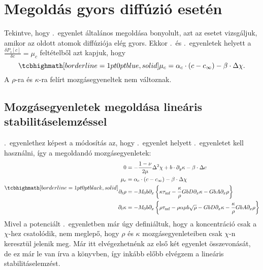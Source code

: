 \documentclass[10pt,a4paper]{scrartcl}
\begin{document}
\section{Megoldás gyors diffúzió esetén}
Tekintve, hogy .\ egyenlet általános megoldása bonyolult, azt az esetet vizsgáljuk, amikor az oldott atomok diffúziója elég gyors. Ekkor .\ és .\ egyenletek helyett a $\frac{{\delta {P_s}[c]}}{{\delta c}} = \mu_c$ feltételből azt kapjuk, hogy
\begin{equation} \label{eq:fd_c}
\tcbhighmath[borderline={1pt}{0pt}{blue,solid}]{
\mu_c = {\alpha _c} \cdot \left( {c - {c_\infty }} \right) - \beta  \cdot \Delta \chi.}
\end{equation}
A $\rho$-ra és $\kappa$-ra felírt mozgásegyeneltek nem változnak.
\subsection{Mozgásegyenletek megoldása lineáris stabilitáselemzéssel}
.\ egyenlethez képest a módosítás az, hogy .\ egyenlet helyett .\ egyenletet kell használni, így a megoldandó mozgásegyenletek:
\begin{gather}
\tcbhighmath[borderline={1pt}{0pt}{black,solid}]{
\begin{aligned}
0 & = - \frac{{1 - \nu }}{{2\mu }}{\Delta ^2}\chi  + b\cdot\partial_y\kappa - \beta  \cdot \Delta c \\
  \mu_c & = {\alpha _c} \cdot \left( {c - {c_\infty }} \right) - \beta  \cdot \Delta \chi \\ 
    {\partial _t}\rho  &  =  - {M_0}b{\partial _x}\left\{ {\kappa {\tau _{{\text{mf}}}} - \frac{\kappa }{\rho }GbD{\partial _x}\kappa  - GbA{\partial _x}\rho } \right\} \\ 
  {\partial _t}\kappa  &  =  - {M_0}b{\partial _x}\left\{ {\rho {\tau _{{\text{mf}}}} - \rho \alpha \mu b\sqrt \rho - GbD{\partial _x}\kappa  - \frac{\kappa }{\rho } GbA{\partial _x}\rho } \right\}
\end{aligned}  }
\end{gather}
Mivel a potenciált .\ egyenletben már úgy definiáltuk, hogy a koncentráció csak a $\chi$-hez csatolódik, nem meglepő, hogy $\rho$ és $\kappa$ mozgásegyenleteiben csak $\chi$-n keresztül jelenik meg. Már itt elvégezhetnénk az első két egyenlet összevonását, de ez már le van írva a könyvben, így inkább előbb elvégzem a lineáris stabilitáselemzést.
\end{document}
